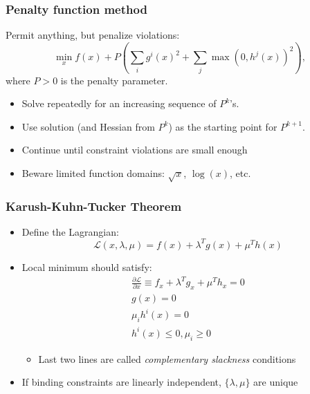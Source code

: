 \documentclass[bigger]{beamer}
\begin{document}
\begin{frame}%

\frametitle{Penalty function method}

Permit anything, but penalize violations: 
\begin{equation*}
\min_{x}f(x)+P\left( \sum_{i}g^{i}(x)^{2}+\sum_{j}\max
(0,h^{j}(x))^{2}\right) ,
\end{equation*}%
where $P>0$ is the penalty parameter. \bigskip

\begin{itemize}
\item Solve repeatedly for an increasing sequence of $P^{k}$'s.

\item Use solution (and Hessian from $P^{k}$) \newline
as the starting point for $P^{k+1}$.

\item Continue until constraint violations are small enough\bigskip

\item Beware limited function domains: $\sqrt{x}$, $\log \left( x\right) $,
etc.
\end{itemize}


\end{frame}%

\begin{frame}%

\frametitle{Karush-Kuhn-Tucker Theorem}

\begin{itemize}
\item Define the Lagrangian:%
\begin{equation*}
\mathcal{L}(x,\lambda ,\mu )=f(x)+\lambda ^{T}g(x)+\mu ^{T}h(x)
\end{equation*}

\item Local minimum should satisfy:%
\begin{gather*}
\frac{\partial \mathcal{L}}{\partial x}\equiv f_{x}+\lambda ^{T}g_{x}+\mu
^{T}h_{x}=0 \\
g(x)=0 \\
\mu _{i}h^{i}(x)=0 \\
h^{i}(x)\leq 0,\mu _{i}\geq 0
\end{gather*}

\begin{itemize}
\item Last two lines are called \emph{complementary slackness }conditions
\end{itemize}

\item If binding constraints are linearly independent, $\{\lambda ,\mu \}$
are unique
\end{itemize}




\end{frame}%
\end{document}
